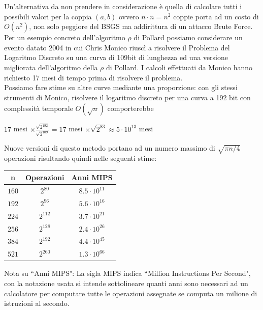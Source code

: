 \documentclass[a4paper,12pt]{tesiinfo}
\newcommand\ddfrac[2]{\frac{\displaystyle #1}{\displaystyle #2}}
\begin{document}
Un'alternativa da non prendere in considerazione \`e quella di calcolare tutti i possibili valori per la coppia $(a, b)$ ovvero $n \cdot n = n^2$ coppie porta ad un costo di $O(n^2)$, non solo peggiore del BSGS ma addirittura di un attacco Brute Force.
\\
Per un esempio concreto dell'algoritmo $\rho$ di Pollard possiamo considerare un evento datato 2004 in cui Chris Monico riusc\`i a risolvere il Problema del Logaritmo Discreto su una curva di 109bit di lunghezza ed una versione migliorata dell'algoritmo della $\rho$ di Pollard. I calcoli effettuati da Monico hanno richiesto 17 mesi di tempo prima di risolvere il problema. 
\\
Possiamo fare stime su altre curve mediante una proporzione: con gli stessi strumenti di Monico, risolvere il logaritmo discreto per una curva a 192 bit con complessit\`a temporale $O(\sqrt{n})$ comporterebbe
\begin{center}
 $17$ mesi $\times \ddfrac{\sqrt{2^{192}}}{\sqrt{2^{109}}} = 17$ mesi $\times \sqrt{2^{83}} \approx 5 \cdot 10^{13}$ mesi\\
\end{center}
Nuove versioni di questo metodo portano ad un numero massimo di $\sqrt{\pi n \big / 4}$ operazioni risultando quindi nelle seguenti stime:
\begin{center}
\begin{tabular}{ c c c }
 n & Operazioni & Anni MIPS\\
 \hline
 $160$ &$2^{80}$ &$8.5 \cdot 10^{11}$\\
 $192$ &$2^{96}$ &$5.6 \cdot 10^{16}$\\
 $224$ &$2^{112}$ &$3.7 \cdot 10^{21}$\\
 $256$ &$2^{128}$ &$2.4 \cdot 10^{26}$\\
 $384$ &$2^{192}$ &$4.4 \cdot 10^{45}$\\
 $521$ &$2^{260}$ &$1.3 \cdot 10^{66}$\\
\end{tabular}
\end{center}
Nota su ``Anni MIPS": La sigla MIPS indica ``Million Instructions Per Second", con la notazione usata si intende sottolineare quanti anni sono necessari ad un calcolatore per computare tutte le operazioni assegnate se computa un milione di istruzioni al secondo.
\end{document}
